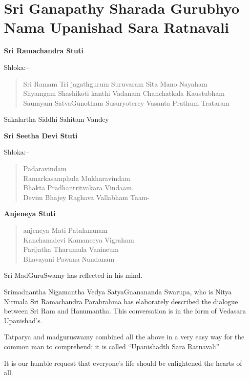 
\chapter*{Sri Ganapathy Sharada Gurubhyo Nama Upanishad Sara Ratnavali}

\begin{center}
\textbf{Sri Ramachandra Stuti}
\end{center}

Shloka:–

\begin{verse}
 Sri Ramam Tri jagathgurum Suruvaram Sita Mano Nayaham \\
 Shyamgam Shashikoti kanthi Vadanam Chanchatkala Kaustubham \\
 Saumyam SatvaGunotham Susuryoterey Vasanta Prathum Trataram
\end{verse}

\begin{center}
Sakalartha Siddhi Sahitam Vandey
\end{center}

\begin{center}
\end{center}

\begin{center}
\textbf{Sri Seetha Devi Stuti}
\end{center}

Shloka:–

\begin{verse}
  Padaravindam\\
 Ramarkasamphula Mukharavindam\\
 Bhakta Pradhantritvakara Vindaam.\\
 Devim Bhajey Raghava Vallabham Taam-
\end{verse}

\begin{center}
\textbf{Anjeneya Stuti}
\end{center}

\begin{verse}
 anjeneya Mati Patalananam \\
 Kanchanadevi Kamaneeya Vigraham\\
 Parijatha Tharumula Vaaineum\\
 Bhavayani Pawana Nandanam
\end{verse}

Sri MadGuruSwamy has reflected in his mind.

Srimadnantha Nigamantha Vedya SatyaGnanananda Swarupa, who is Nitya Nirmala Sri Ramachandra Parabrahma has elaborately described the dialogue between Sri Ram and Hanumantha. This conversation is in the form of Vedasara Upanishad's.

Tatparya and madguruswamy combined all the above in a very easy way for the common man to comprehend; it is called “Upanishadth Sara Ratnavali”

It is our humble request that everyone's life should be enlightened the hearts of all.


